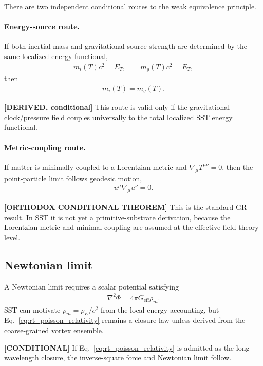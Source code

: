 There are two independent conditional routes to the weak equivalence principle.

\paragraph{Energy-source route.}
If both inertial mass and gravitational source strength are determined by the
same localized energy functional,
\begin{align}
    m_i(T)c^2 = E_T,
    \qquad
    m_g(T)c^2 = E_T,
\end{align}
then
\begin{align}
    m_i(T)=m_g(T).
\end{align}

\textbf{[DERIVED, conditional]} This route is valid only if the gravitational
clock/pressure field couples universally to the total localized SST energy
functional.

\paragraph{Metric-coupling route.}
If matter is minimally coupled to a Lorentzian metric and
\(\nabla_\mu T^{\mu\nu}=0\), then the point-particle limit follows geodesic
motion,
\begin{align}
    u^\mu \nabla_\mu u^\nu =0 .
\end{align}

\textbf{[ORTHODOX CONDITIONAL THEOREM]} This is the standard GR result. In SST
it is not yet a primitive-substrate derivation, because the Lorentzian metric
and minimal coupling are assumed at the effective-field-theory level.

\subsection{Newtonian limit}

A Newtonian limit requires a scalar potential satisfying
\begin{align}
    \nabla^2 \Phi
    =
    4\pi G_{\mathrm{eff}}\rho_{\!m}.
    \label{eq:rt_poisson_relativity}
\end{align}
SST can motivate \(\rho_{\!m}=\rho_{\!E}/c^2\) from the local energy accounting,
but Eq.~\eqref{eq:rt_poisson_relativity} remains a closure law unless derived from the
coarse-grained vortex ensemble.

\textbf{[CONDITIONAL]} If Eq.~\eqref{eq:rt_poisson_relativity} is admitted as the
long-wavelength closure, the inverse-square force and Newtonian limit follow.

